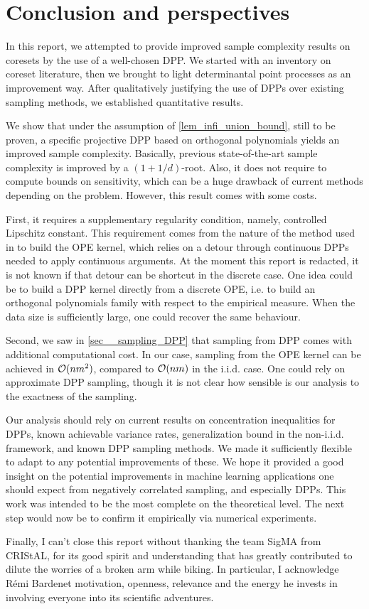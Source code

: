\chapter{Conclusion and perspectives}
\label{sec__discussion_perspectives}

In this report, we attempted to provide improved sample complexity results on coresets by the use of a well-chosen DPP. We started with an inventory on coreset literature, then we brought to light determinantal point processes as an improvement way. After qualitatively justifying the use of DPPs over existing sampling methods, we established quantitative results.

We show that under the assumption of \cref{lem_infi_union_bound}, still to be proven, a specific projective DPP based on orthogonal polynomials yields an improved sample complexity. Basically, previous state-of-the-art sample complexity is improved by a $(1+1/d)$-root. Also, it does not require to compute bounds on sensitivity, which can be a huge drawback of current methods depending on the problem. However, this result comes with some costs. 

First, it requires a supplementary regularity condition, namely, controlled Lipschitz constant. This requirement comes from the nature of the method used in \cite{bardenet2020mcdpp} to build the OPE kernel, which relies on a detour through continuous DPPs needed to apply continuous arguments. At the moment this report is redacted, it is not known if that detour can be shortcut in the discrete case. One idea could be to build a DPP kernel directly from a discrete OPE, i.e. to build an orthogonal polynomials family with respect to the empirical measure. When the data size is sufficiently large, one could recover the same behaviour.

Second, we saw in \cref{sec__sampling_DPP} that sampling from DPP comes with additional computational cost. In our case, sampling from the OPE kernel can be achieved in $\mathcal{O}(nm^2)$, compared to $\mathcal{O}(nm)$ in the i.i.d. case. One could rely on approximate DPP sampling, though it is not clear how sensible is our analysis to the exactness of the sampling.

Our analysis should rely on current results on concentration inequalities for DPPs, known achievable variance rates, generalization bound in the non-i.i.d. framework, and known DPP sampling methods. We made it sufficiently flexible to adapt to any potential improvements of these. We hope it provided a good insight on the potential improvements in machine learning applications one should expect from negatively correlated sampling, and especially DPPs. This work was intended to be the most complete on the theoretical level. The next step would now be to confirm it empirically via numerical experiments.


Finally, I can't close this report without thanking the team SigMA from CRIStAL, for its good spirit and understanding that has greatly contributed to dilute the worries of a broken arm while biking. In particular, I acknowledge R\'emi Bardenet motivation, openness, relevance and the energy he invests in involving everyone into its scientific adventures.





